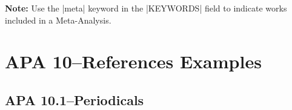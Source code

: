 \documentclass[paper=a4]{article}
\begin{document}
\newpage
\begin{refsection}

\nocite{9.51:1,9.51:2}

\printbibliography[heading=subbibliography,title={APA 9.51--Annotated Bibliographies}]

\end{refsection}
\newpage
\begin{refsection}

\nocite{9.52:1,9.52:2,9.52:3,9.52:4}

\printbibliography[heading=subbibliography,title={APA 9.52--References Included in a Meta-Analysis}]

\noindent\textbf{Note:} Use the |meta| keyword in the |KEYWORDS| field to
indicate works included in a Meta-Analysis.

\end{refsection}
\newpage
\section{APA 10--References Examples}
\subsection{APA 10.1--Periodicals}
\end{document}
